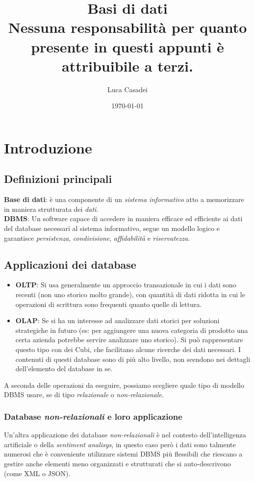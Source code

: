 \documentclass[a4paper,12pt]{report}
\title{\textbf{Basi di dati}\\Nessuna responsabilità per quanto presente in questi appunti è attribuibile a terzi.}
\author{Luca Casadei}
\date{\today}
\begin{document}
	\maketitle
	\tableofcontents
	\chapter{Introduzione}
	\section{Definizioni principali}
	\textbf{Base di dati}: è una componente di un \textit{sistema informativo} atto a memorizzare in maniera strutturata dei \textit{dati}.\\
	\textbf{DBMS}: Un software capace di accedere in maniera efficace ed efficiente ai dati del database necessari al sistema informativo, segue un modello logico e garantisce \textit{persistenza}, \textit{condivisione}, \textit{affidabilità} e \textit{riservatezza}.
	\section{Applicazioni dei database}
	\begin{itemize}
		\item \textbf{OLTP}: Si usa generalmente un approccio transazionale in cui i dati sono recenti (non uno storico molto grande), con quantità di dati ridotta in cui le operazioni di scrittura sono frequenti quanto quelle di lettura.
		\item \textbf{OLAP}: Se si ha un interesse ad analizzare dati storici per soluzioni strategiche in futuro (es: per aggiungere una nuova categoria di prodotto una certa azienda potrebbe servire analizzare uno storico). Si può rappresentare questo tipo con dei Cubi, che facilitano alcune ricerche dei dati necessari. I contenuti di questi database sono di più alto livello, non scendono nei dettagli dell'elemento del database in se.
	\end{itemize}
A seconda delle operazioni da eseguire, possiamo scegliere quale tipo di modello DBMS usare, se di tipo \textit{relazionale} o \textit{non-relazionale}.
\subsection{Database \textit{non-relazionali} e loro applicazione}
Un'altra applicazione dei database \textit{non-relazionali} è nel contesto dell'intelligenza artificiale o della \textit{sentiment analisys}, in questo caso però i dati sono talmente numerosi che è conveniente utilizzare sistemi DBMS più flessibili che riescano a gestire anche elementi meno organizzati e strutturati che si auto-descrivono (come XML o JSON).\\
\end{document}
